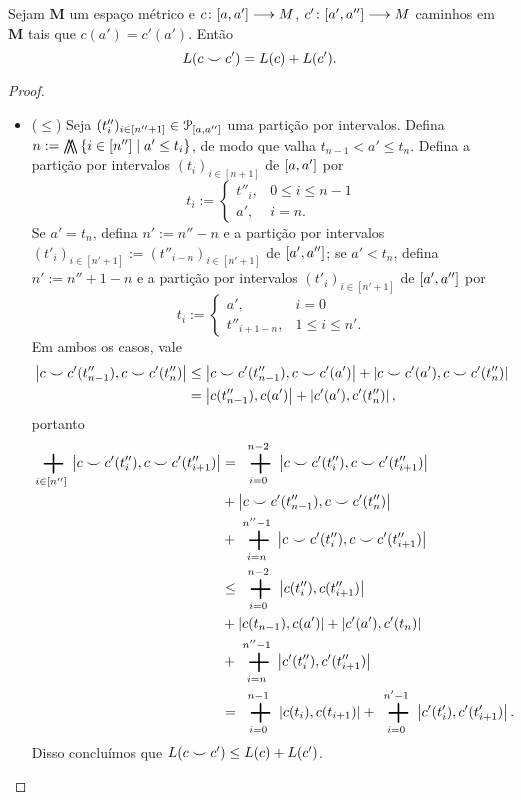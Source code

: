 \begin{proposition}
Sejam $\bm M$ um espaço métrico e ${c}\colon {\left[{a},{a'}\right]} \longrightarrow {M}$, ${c'}\colon {\left[{a'},{a''}\right]} \longrightarrow {M}$ caminhos em $\bm M$ tais que $c(a') = c'(a')$. Então
	\begin{equation*}
	L(c \smile c') = L(c) + L(c').
	\end{equation*}
\end{proposition}
\begin{proof}
	\begin{itemize}
	\item ($\leq$) Seja $(t''_i)_{i \in [n''+1]} \in \mathcal{P}_{\left[{a},{a''}\right]}$ uma partição por intervalos. Defina $n := \min\set{i \in [n'']}{a' \leq t_i}$, de modo que valha $t_{n-1} < a' \leq t_n$. Defina a partição por intervalos $(t_i)_{i \in [n+1]}$ de $\left[{a},{a'}\right]$ por
		\begin{equation*}
		t_i := \begin{cases}
				t''_i,	& 0 \leq i \leq n-1 \\
				a',		& i = n.
				\end{cases}
		\end{equation*}
	Se $a' = t_n$, defina $n' := n''-n$ e a partição por intervalos $(t'_i)_{i \in [n'+1]} := (t''_{i-n})_{i \in [n'+1]}$ de $\left[{a'},{a''}\right]$; se $a' < t_n$, defina $n' := n''+1-n$ e a partição por intervalos $(t'_i)_{i \in [n'+1]}$ de $\left[{a'},{a''}\right]$ por
		\begin{equation*}
		t_i := \begin{cases}
				a',				& i=0 \\
				t''_{i+1-n},	& 1 \leq i \leq n'.
				\end{cases}
		\end{equation*}
	Em ambos os casos, vale
		\begin{align*}
		\left\vert{c \smile c'(t''_{n-1})},{c \smile c'(t''_n)}\right\vert &\leq \left\vert{c \smile c'(t''_{n-1})},{c \smile c'(a')}\right\vert + \left\vert{c \smile c'(a')},{c \smile c'(t''_n)}\right\vert \\
			&= \left\vert{c(t''_{n-1})},{c(a')}\right\vert + \left\vert{c'(a')},{c'(t''_n)}\right\vert,
		\end{align*}
	portanto
		\begin{align*}
		\sum_{i \in [n'']} \dist{c \conca c'(t''_i)}{c \conca c'(t''_{i+1})} &= \sum_{i=0}^{n-2} \dist{c \conca c'(t''_i)}{c \conca c'(t''_{i+1})} \\
			&+ \dist{c \conca c'(t''_{n-1})}{c \conca c'(t''_n)} \\
			&+ \sum_{i=n}^{n''-1} \dist{c \conca c'(t''_i)}{c \conca c'(t''_{i+1})} \\
			&\leq \sum_{i=0}^{n-2} \dist{c(t''_i)}{c(t''_{i+1})} \\
			&+ \dist{c(t_{n-1})}{c(a')} + \dist{c'(a')}{c'(t_n)} \\
			&+ \sum_{i=n}^{n''-1} \dist{c'(t''_i)}{c'(t''_{i+1})} \\
			&= \sum_{i=0}^{n-1} \dist{c(t_i)}{c(t_{i+1})} + \sum_{i=0}^{n'-1} \dist{c'(t'_i)}{c'(t'_{i+1})}.
		\end{align*}
	Disso concluímos que $L(c \smile c') \leq L(c) + L(c')$.


\end{itemize}
\end{proof}
